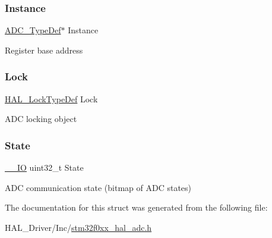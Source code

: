\subsubsection{\texorpdfstring{Instance}{Instance}}
{\footnotesize\ttfamily \hyperlink{struct_a_d_c___type_def}{A\+D\+C\+\_\+\+Type\+Def}$\ast$ Instance}

Register base address \mbox{\label{struct_a_d_c___handle_type_def_ad4cf225029dbefe8d3fe660c33b8bb6b}} 
\subsubsection{\texorpdfstring{Lock}{Lock}}
{\footnotesize\ttfamily \hyperlink{stm32f0xx__hal__def_8h_ab367482e943333a1299294eadaad284b}{H\+A\+L\+\_\+\+Lock\+Type\+Def} Lock}

A\+DC locking object \mbox{\label{struct_a_d_c___handle_type_def_ae822ffccdec1899d5cfcbab448119810}} 
\subsubsection{\texorpdfstring{State}{State}}
{\footnotesize\ttfamily \hyperlink{core__sc300_8h_aec43007d9998a0a0e01faede4133d6be}{\+\_\+\+\_\+\+IO} uint32\+\_\+t State}

A\+DC communication state (bitmap of A\+DC states) 

The documentation for this struct was generated from the following file\+:\begin{DoxyCompactItemize}
\item 
H\+A\+L\+\_\+\+Driver/\+Inc/\hyperlink{stm32f0xx__hal__adc_8h}{stm32f0xx\+\_\+hal\+\_\+adc.\+h}\end{DoxyCompactItemize}

